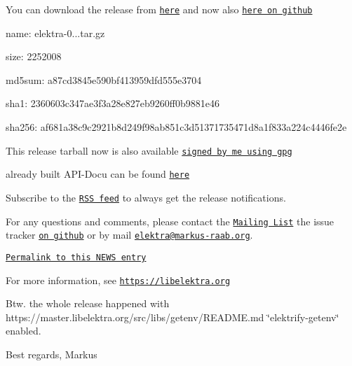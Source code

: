You can download the release from \href{https://www.libelektra.org/ftp/elektra/releases/elektra-0.8.14.tar.gz}{\tt here} and now also \href{https://github.com/ElektraInitiative/ftp/tree/master/releases/elektra-0.8.14.tar.gz}{\tt here on github}


\begin{DoxyItemize}
\item name\+: elektra-\/0...\+tar.\+gz
\item size\+: 2252008
\item md5sum\+: a87cd3845e590bf413959dfd555e3704
\item sha1\+: 2360603c347ae3f3a28e827eb9260ff0b9881e46
\item sha256\+: af681a38c9c2921b8d249f98ab851c3d51371735471d8a1f833a224c4446fe2e
\end{DoxyItemize}

This release tarball now is also available \href{https://www.libelektra.org/ftp/elektra/releases/elektra-0.8.14.tar.gz.gpg}{\tt signed by me using gpg}

already built A\+P\+I-\/\+Docu can be found \href{https://doc.libelektra.org/api/0.8.14/html/}{\tt here}

Subscribe to the \href{https://doc.libelektra.org/news/feed.rss}{\tt R\+SS feed} to always get the release notifications.

For any questions and comments, please contact the \href{https://lists.sourceforge.net/lists/listinfo/registry-list}{\tt Mailing List} the issue tracker \href{https://git.libelektra.org/issues}{\tt on github} or by mail \href{mailto:elektra@markus-raab.org}{\tt elektra@markus-\/raab.\+org}.

\href{https://doc.libelektra.org/news/519cbfac-6db5-4594-8a38-dec4c84b134f.html}{\tt Permalink to this N\+E\+WS entry}

For more information, see \href{https://libelektra.org}{\tt https\+://libelektra.\+org}

Btw. the whole release happened with https\+://master.libelektra.\+org/src/libs/getenv/\+R\+E\+A\+D\+ME.md \char`\"{}elektrify-\/getenv\char`\"{} enabled.

Best regards, Markus 